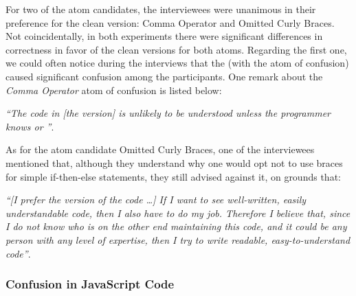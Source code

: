 For two of the atom candidates, the interviewees were unanimous in their preference for the clean version: Comma Operator and Omitted Curly Braces. Not coincidentally, in both experiments there were significant differences in correctness in favor of the clean versions for both atoms. Regarding the first one, we could often notice during the interviews that the \emph{\lhs} (with the atom of confusion) caused significant confusion among the participants. One remark about the \emph{Comma Operator} atom of confusion is listed below:


\begin{mq}
\emph{``The code in [the \lhs version] is unlikely to be understood unless the programmer knows \clang or \cpplang''}.
\end{mq}

As for the atom candidate Omitted Curly Braces, one of the interviewees mentioned that, although they understand why one would opt not to use braces for simple if-then-else statements, they still advised against it, on grounds that:

\begin{mq}
\emph{``[I prefer the \rhs version of the code \ldots]
If I want to see well-written, easily understandable code, then I also have to do my job. Therefore I believe that, since I do not know who is on the other end maintaining this code, and it could be any person with any level of expertise, then I try to write readable, easy-to-understand code''}.
\end{mq}





\subsubsection*{Confusion in JavaScript Code} 

